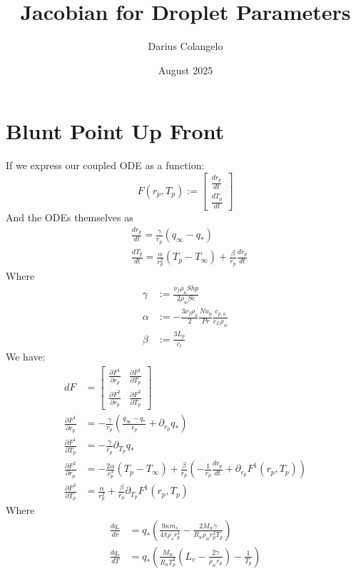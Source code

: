 \documentclass{article}
\title{Jacobian for Droplet Parameters}
\author{Darius Colangelo}
\date{August 2025}
\begin{document}
\maketitle

\section{Blunt Point Up Front}
If we express our coupled ODE as a function:
\[
    F(r_{p}, T_{p}) := \begin{bmatrix}
        \frac{dr_{p}}{dt}\\
        \frac{dT_{p}}{dt}
    \end{bmatrix}
\]
And the ODEs themselves as
\begin{align*}
     &\frac{dr_{p}}{dt} = \frac{\gamma}{r_{p}}(q_{\infty} - q_*)\\
     &\frac{dT_{p}}{dt} = \frac{\alpha}{r_{p}^2}(T_{p}-T_{\infty})
	                + \frac{\beta}{r_{p}}\frac{dr_{p}}{dt}
\end{align*}
Where
\begin{align*}
	\gamma &:= \frac{\nu_{f}\rho_{a}Shp}{2\rho_{w}Sc}\\
        \alpha &:= -\frac{3\nu_{f}\rho_{a}}{2}\frac{Nu_{p}}{Pr}\frac{c_{p,a}}{c_L\rho_{w}}\\
        \beta  &:= \frac{3L_{p}}{c_{l}}
\end{align*}
We have:
\begin{align*}
    dF &= \begin{bmatrix}
        \frac{\partial F^1}{\partial r_{p}} & \frac{\partial F^1}{\partial T_{p}}\\
        \frac{\partial F^2}{\partial r_{p}} & \frac{\partial F^2}{\partial T_{p}}
    \end{bmatrix}\\
    \frac{\partial F^1}{\partial r_{p}} &= -\frac{\gamma}{r_{p}}\left(\frac{q_{\infty} - q_*}{r_{p}}
                                           + \partial_{r_{p}}q_*\right)\\
    \frac{\partial F^1}{\partial T_{p}} &= -\frac{\gamma}{r_{p}}\partial_{T_{p}}q_*\\
    \frac{\partial F^2}{\partial r_{p}} &= -\frac{2\alpha}{r_{p}^3}(T_{p}-T_{\infty})
                                          + \frac{\beta}{r_p}\left(-\frac{1}{r_{p}}\frac{dr_{p}}{dt}
                                          + \partial_{r_{p}}F^1(r_{p},T_{p})\right)\\
    \frac{\partial F^2}{\partial T_{p}} &= \frac{\alpha}{r_{p}^2}+\frac{\beta}{r_{p}}\partial_{T_{p}}F^1(r_{p},T_{p})
\end{align*}
Where
\begin{align*}
    \frac{dq_*}{dr} &= q_*\left(\frac{9\kappa m_{s}}{4\pi\rho_{s}r_{p}^4}
		     - \frac{2M_{w}\gamma}{R_{u}\rho_w r_{p}^2T_{p}}\right)\\
    \frac{dq_*}{dT} &= q_*\left(\frac{M_{w}}{R_{u}T_{p}^2}\left(L_{v}- \frac{2\gamma}{\rho_w r_{p}}\right)-\frac{1}{T_{p}}\right)\\
\end{align*}
\end{document}
